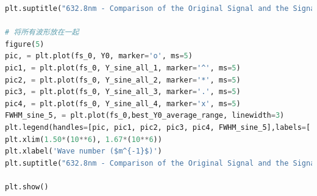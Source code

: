 \documentclass[conference]{IEEEtran}
\begin{document}
\begin{lstlisting}[language=python]
plt.suptitle("632.8nm - Comparison of the Original Signal and the Signal after Adding Sinusoidal Noise", fontsize = 20)

# 将所有波形放在一起
figure(5)
pic, = plt.plot(fs_0, Y0, marker='o', ms=5)
pic1, = plt.plot(fs_0, Y_sine_all_1, marker='^', ms=5)
pic2, = plt.plot(fs_0, Y_sine_all_2, marker='*', ms=5)
pic3, = plt.plot(fs_0, Y_sine_all_3, marker='.', ms=5)
pic4, = plt.plot(fs_0, Y_sine_all_4, marker='x', ms=5)
FWHM_sine_5, = plt.plot(fs_0,best_Y0_average_range, linewidth=3)
plt.legend(handles=[pic, pic1, pic2, pic3, pic4, FWHM_sine_5],labels=['Original', 'One Sine Noise', 'Two Sine Noise', 'Three Sine Noise', 'Four Sine Noise', 'FWHM'], loc='upper right')
plt.xlim(1.50*(10**6), 1.67*(10**6))
plt.xlabel('Wave number ($m^{-1}$)')
plt.suptitle("632.8nm - Comparison of the Original Signal and the Signal after Adding Sinusoidal Noise", fontsize = 20)

plt.show()

\end{lstlisting}
\end{document}
